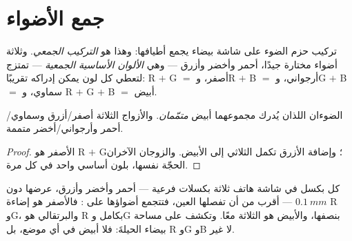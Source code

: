\section{جمع الأضواء}

\begin{definition}\label{def:g11:color-light-sources:additive}
تركيب حزم الضوء على شاشة بيضاء يجمع أطيافها: وهذا هو
\emph{التركيب الجمعي}. وثلاثة أضواء مختارة جيدًا،
أحمر وأخضر وأزرق --- وهي \emph{الألوان الأساسية
الجمعية} --- تمتزج لتعطي كل لون يمكن إدراكه
تقريبًا: R $+$ G $=$ أصفر، وR $+$ B $=$ أرجواني، وG $+$ B $=$ سماوي، و
R $+$ G $+$ B $=$ أبيض.
\end{definition}

\begin{proposition}\label{prop:g11:color-light-sources:complementary}
الضوءان اللذان يُدرك مجموعهما أبيض
\emph{متمّمان}. والأزواج الثلاثة
أصفر/أزرق وسماوي/أحمر وأرجواني/أخضر متممة.
\end{proposition}

\begin{proof}
الأصفر هو R $+$ G؛ وإضافة الأزرق تكمل الثلاثي إلى الأبيض. والزوجان
الآخران الحجّة نفسها، بلون أساسي واحد في كل مرة.
\end{proof}

\begin{example}[الشاشات]\label{ex:g11:color-light-sources:screen}
كل بكسل في شاشة هاتف ثلاثة بكسلات فرعية --- أحمر وأخضر وأزرق،
عرضها دون $\qty{0.1}{mm}$ --- أقرب من أن تفصلها العين، فتتجمع
أضواؤها على : فالأصفر هو إضاءة R وG، والبرتقالي هو R
بكامل  وG بنصفها، والأبيض هو الثلاثة معًا. وتكشف  
على مساحة بيضاء الحيلةَ: فلا أبيض في أي موضع، بل R وG وB لا غير.
\end{example}

